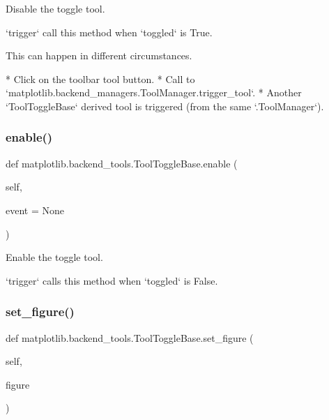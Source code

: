 \begin{DoxyVerb}Disable the toggle tool.

`trigger` call this method when `toggled` is True.

This can happen in different circumstances.

* Click on the toolbar tool button.
* Call to `matplotlib.backend_managers.ToolManager.trigger_tool`.
* Another `ToolToggleBase` derived tool is triggered
  (from the same `.ToolManager`).
\end{DoxyVerb}
 \mbox{\label{classmatplotlib_1_1backend__tools_1_1ToolToggleBase_a6f4a8940f70797e22c434d4e14fddf71}} 
\subsubsection{\texorpdfstring{enable()}{enable()}}
{\footnotesize\ttfamily def matplotlib.\+backend\+\_\+tools.\+Tool\+Toggle\+Base.\+enable (\begin{DoxyParamCaption}\item[{}]{self,  }\item[{}]{event = {\ttfamily None} }\end{DoxyParamCaption})}

\begin{DoxyVerb}Enable the toggle tool.

`trigger` calls this method when `toggled` is False.
\end{DoxyVerb}
 \mbox{\label{classmatplotlib_1_1backend__tools_1_1ToolToggleBase_aadec6025f331381d975f62c1a47ecc27}} 
\subsubsection{\texorpdfstring{set\+\_\+figure()}{set\_figure()}}
{\footnotesize\ttfamily def matplotlib.\+backend\+\_\+tools.\+Tool\+Toggle\+Base.\+set\+\_\+figure (\begin{DoxyParamCaption}\item[{}]{self,  }\item[{}]{figure }\end{DoxyParamCaption})}

